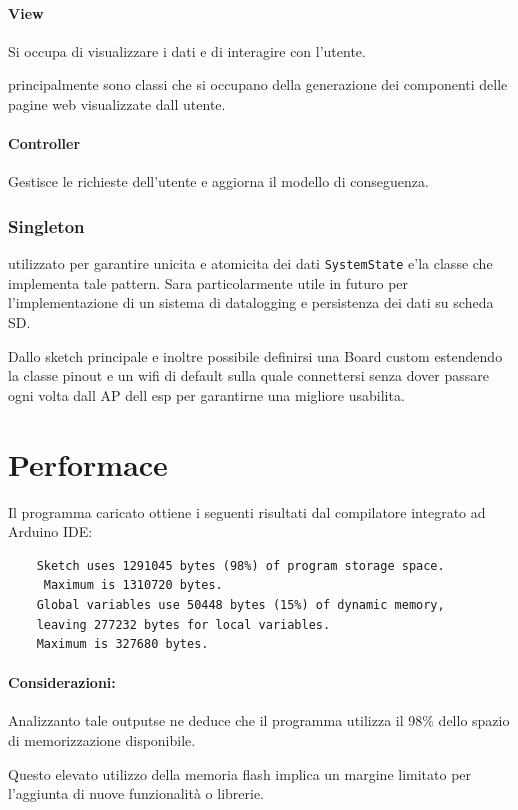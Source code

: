 \documentclass[12pt,a4paper]{report}
\begin{document}
\paragraph{View} Si occupa di visualizzare i dati e di interagire con l'utente.

principalmente sono classi che si occupano della generazione dei componenti delle pagine web visualizzate dall utente.

\paragraph{Controller} Gestisce le richieste dell'utente e aggiorna il modello di conseguenza.

\subsubsection{Singleton}
utilizzato per garantire unicita e atomicita dei dati \texttt{SystemState} e'la classe che implementa tale pattern.
Sara particolarmente utile in futuro per l'implementazione di un sistema di datalogging e persistenza dei dati su scheda SD.

Dallo sketch principale e inoltre possibile definirsi una Board custom estendendo la classe pinout e un wifi di default sulla quale connettersi senza dover passare ogni volta dall AP dell esp per garantirne una migliore usabilita.


\section{Performace}

Il programma caricato ottiene i seguenti risultati dal compilatore integrato ad Arduino IDE:
\begin{verbatim}
    Sketch uses 1291045 bytes (98%) of program storage space.
     Maximum is 1310720 bytes.
    Global variables use 50448 bytes (15%) of dynamic memory, 
    leaving 277232 bytes for local variables. 
    Maximum is 327680 bytes.
\end{verbatim}

\paragraph{Considerazioni: }

Analizzanto tale outputse ne deduce che il programma utilizza il 98\%
dello spazio di memorizzazione disponibile. 

Questo elevato utilizzo della memoria flash implica un margine limitato per l'aggiunta di nuove funzionalità o librerie.
\end{document}
